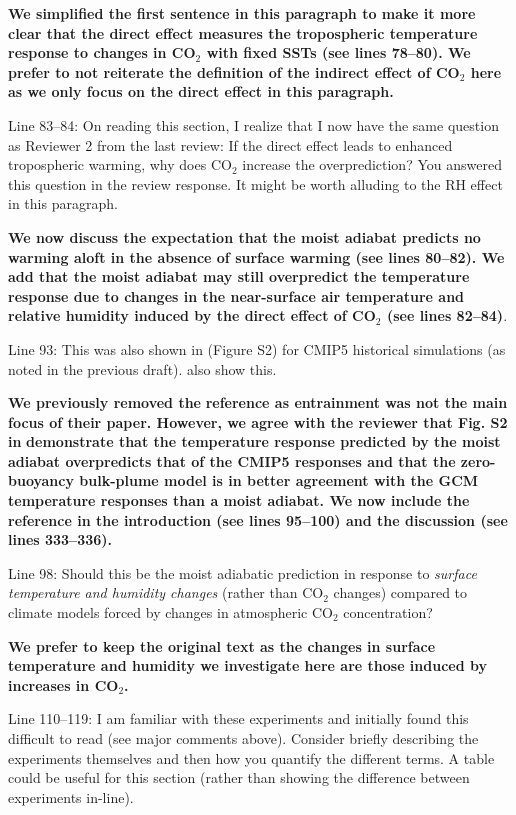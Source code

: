 \documentclass[11pt]{article}
\begin{document}
\textbf{We simplified the first sentence in this paragraph to make it more clear that the direct effect measures the tropospheric temperature response to changes in CO\(_2\) with fixed SSTs (see lines 78--80). We prefer to not reiterate the definition of the indirect effect of CO\(_2\) here as we only focus on the direct effect in this paragraph.}

Line 83--84: On reading this section, I realize that I now have the same question as Reviewer 2 from the last review: If the direct effect leads to enhanced tropospheric warming, why does CO\(_2\) increase the overprediction? You answered this question in the review response. It might be worth alluding to the RH effect in this paragraph.

\textbf{We now discuss the expectation that the moist adiabat predicts no warming aloft in the absence of surface warming (see lines 80--82). We add that the moist adiabat may still overpredict the temperature response due to changes in the near-surface air temperature and relative humidity induced by the direct effect of CO\(_2\) (see lines 82--84)}.

Line 93: This was also shown in \cite{po-chedley2019} (Figure S2) for CMIP5 historical simulations (as noted in the previous draft). \cite{santer2005} also show this.

\textbf{We previously removed the} \cite{po-chedley2019} \textbf{reference as entrainment was not the main focus of their paper. However, we agree with the reviewer that Fig. S2 in} \cite{po-chedley2019} \textbf{demonstrate that the temperature response predicted by the moist adiabat overpredicts that of the CMIP5 responses and that the zero-buoyancy bulk-plume model is in better agreement with the GCM temperature responses than a moist adiabat. We now include the} \cite{po-chedley2019} \textbf{reference in the introduction (see lines 95--100) and the discussion (see lines 333--336).}

Line 98: Should this be the moist adiabatic prediction in response to \emph{surface temperature and humidity changes} (rather than CO\(_2\) changes) compared to climate models forced by changes in atmospheric CO\(_2\) concentration?

\textbf{We prefer to keep the original text as the changes in surface temperature and humidity we investigate here are those induced by increases in CO\(_2\).}

Line 110--119: I am familiar with these experiments and initially found this difficult to read (see major comments above). Consider briefly describing the experiments themselves and then how you quantify the different terms. A table could be useful for this section (rather than showing the difference between experiments in-line).
\end{document}
